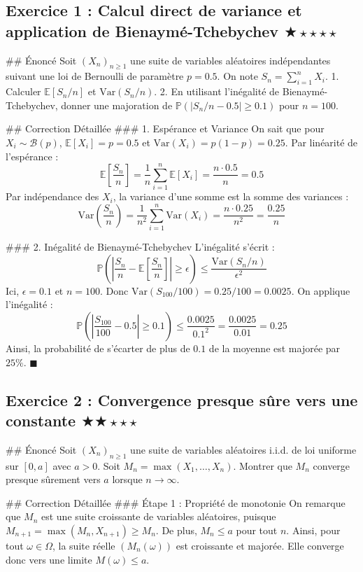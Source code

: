 \documentclass[11pt,a4paper]{article}
\begin{document}
\subsection*{Exercice 1 : Calcul direct de variance et application de Bienaymé-Tchebychev \quad $\bigstar\star\star\star\star$}

\#\# Énoncé
Soit $(X_n)_{n \ge 1}$ une suite de variables aléatoires indépendantes suivant une loi de Bernoulli de paramètre $p = 0.5$. On note $S_n = \sum_{i=1}^n X_i$.
1. Calculer $\mathbb{E}[S_n/n]$ et $\text{Var}(S_n/n)$.
2. En utilisant l'inégalité de Bienaymé-Tchebychev, donner une majoration de $\mathbb{P}(|S_n/n - 0.5| \ge 0.1)$ pour $n=100$.

\#\# Correction Détaillée
\#\#\# 1. Espérance et Variance
On sait que pour $X_i \sim \mathcal{B}(p)$, $\mathbb{E}[X_i] = p = 0.5$ et $\text{Var}(X_i) = p(1-p) = 0.25$.
Par linéarité de l'espérance :
$$ \mathbb{E}\left[\frac{S_n}{n}\right] = \frac{1}{n} \sum_{i=1}^n \mathbb{E}[X_i] = \frac{n \cdot 0.5}{n} = 0.5 $$
Par indépendance des $X_i$, la variance d'une somme est la somme des variances :
$$ \text{Var}\left(\frac{S_n}{n}\right) = \frac{1}{n^2} \sum_{i=1}^n \text{Var}(X_i) = \frac{n \cdot 0.25}{n^2} = \frac{0.25}{n} $$

\#\#\# 2. Inégalité de Bienaymé-Tchebychev
L'inégalité s'écrit :
$$ \mathbb{P}\left( \left| \frac{S_n}{n} - \mathbb{E}\left[\frac{S_n}{n}\right] \right| \ge \epsilon \right) \le \frac{\text{Var}(S_n/n)}{\epsilon^2} $$
Ici, $\epsilon = 0.1$ et $n = 100$. Donc $\text{Var}(S_{100}/100) = 0.25/100 = 0.0025$.
On applique l'inégalité :
$$ \mathbb{P}\left( \left| \frac{S_{100}}{100} - 0.5 \right| \ge 0.1 \right) \le \frac{0.0025}{0.1^2} = \frac{0.0025}{0.01} = 0.25 $$
Ainsi, la probabilité de s'écarter de plus de $0.1$ de la moyenne est majorée par $25\%$. $\blacksquare$


\subsection*{Exercice 2 : Convergence presque sûre vers une constante \quad $\bigstar\bigstar\star\star\star$}

\#\# Énoncé
Soit $(X_n)_{n \ge 1}$ une suite de variables aléatoires i.i.d. de loi uniforme sur $[0, a]$ avec $a>0$. Soit $M_n = \max(X_1, \dots, X_n)$.
Montrer que $M_n$ converge presque sûrement vers $a$ lorsque $n \to \infty$.

\#\# Correction Détaillée
\#\#\# Étape 1 : Propriété de monotonie
On remarque que $M_n$ est une suite croissante de variables aléatoires, puisque $M_{n+1} = \max(M_n, X_{n+1}) \ge M_n$. De plus, $M_n \le a$ pour tout $n$. Ainsi, pour tout $\omega \in \Omega$, la suite réelle $(M_n(\omega))$ est croissante et majorée. Elle converge donc vers une limite $M(\omega) \le a$.
\end{document}
